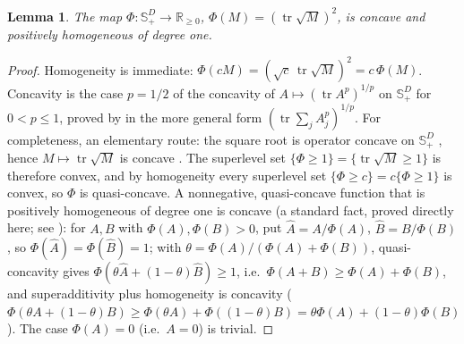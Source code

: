 \documentclass[11pt]{article}
\newtheorem{lemma}[theorem]{Lemma}
\theoremstyle{definition}
\newcommand{\tr}{\operatorname{tr}}
\newcommand{\R}{\mathbb{R}}
\newcommand{\PSD}{\mathbb{S}_{+}}
\begin{document}
\begin{lemma}\label{lem:phi}
The map $\Phi:\PSD^D\to\R_{\ge0}$, $\Phi(M)=(\tr\sqrt M)^2$, is concave and positively homogeneous of degree one.
\end{lemma}
\begin{proof}
Homogeneity is immediate: $\Phi(cM)=(\sqrt c\,\tr\sqrt M)^2=c\,\Phi(M)$. Concavity is the case $p=1/2$ of the concavity of $A\mapsto(\tr A^p)^{1/p}$ on $\PSD^D$ for $0<p\le1$, proved by \citet{carlen2008minkowski} in the more general form $(\tr\sum_jA_j^p)^{1/p}$. For completeness, an elementary route: the square root is operator concave on $\PSD^D$ \citep{bhatia1997matrix,ando1979concavity}, hence $M\mapsto\tr\sqrt M$ is concave \citep{carlen2010trace}. The superlevel set $\{\Phi\ge1\}=\{\tr\sqrt M\ge1\}$ is therefore convex, and by homogeneity every superlevel set $\{\Phi\ge c\}=c\{\Phi\ge1\}$ is convex, so $\Phi$ is quasi-concave. A nonnegative, quasi-concave function that is positively homogeneous of degree one is concave (a standard fact, proved directly here; see \citealp[\S3.4]{boyd2004convex}): for $A,B$ with $\Phi(A),\Phi(B)>0$, put $\hat A=A/\Phi(A)$, $\hat B=B/\Phi(B)$, so $\Phi(\hat A)=\Phi(\hat B)=1$; with $\theta=\Phi(A)/(\Phi(A)+\Phi(B))$, quasi-concavity gives $\Phi(\theta\hat A+(1-\theta)\hat B)\ge1$, i.e.\ $\Phi(A+B)\ge\Phi(A)+\Phi(B)$, and superadditivity plus homogeneity is concavity ($\Phi(\theta A+(1-\theta)B)\ge\Phi(\theta A)+\Phi((1-\theta)B)=\theta\Phi(A)+(1-\theta)\Phi(B)$). The case $\Phi(A)=0$ (i.e.\ $A=0$) is trivial.
\end{proof}
\end{document}
